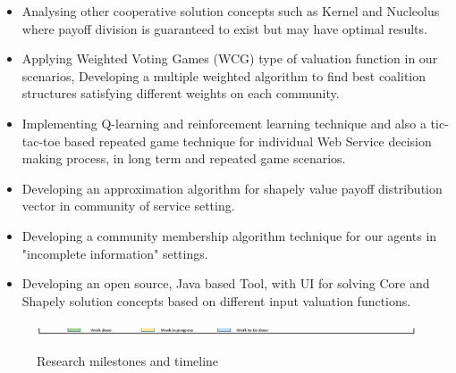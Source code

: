 \begin{itemize}
\item Analysing other cooperative solution concepts such as Kernel and Nucleolus where payoff division is guaranteed to exist but may have optimal results.
\item Applying Weighted Voting Games (WCG) type of valuation function in our scenarios, Developing a multiple weighted algorithm to find best coalition structures satisfying different weights on each community.
\item Implementing Q-learning and reinforcement learning technique and also a tic-tac-toe based repeated game technique for individual Web Service decision making process, in long term and repeated game scenarios.
\item Developing an approximation algorithm for shapely value payoff distribution vector in community of service setting.
\item Developing a community membership algorithm technique for our agents in "incomplete information" settings.
\item Developing an open source, Java based Tool, with UI for solving Core and Shapely solution concepts based on different input valuation functions.
\end{itemize}


    \begin{figure}
                \begin{center}
                \includegraphics[width=16cm]{timeline/timetable.eps}\label{Timetable}
                \caption{Research milestones and timeline}
                \end{center}
    \end{figure}   